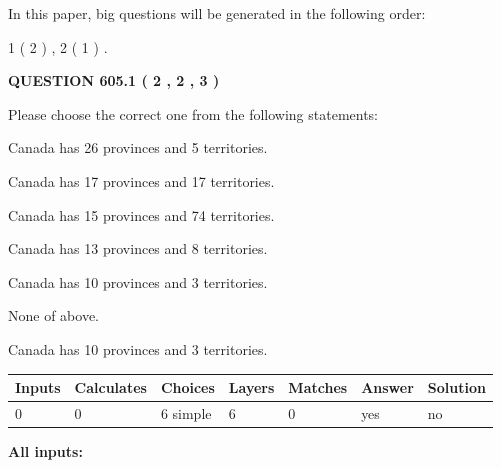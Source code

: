 \documentclass[12pt]{article}
\begin{document}
In this paper, big questions will be generated in the following order: 
   
   
   1 ( 2 )
 ,
   2 ( 1 )
 .
  
\vspace{0.2in}
  
{\textbf{\Large{QUESTION
605.1 
 ( 2 , 2 , 3 )
}}}
  
  
Please choose the correct one from the following statements:
 
 
Canada has  26 provinces and  5 territories.
 
 
Canada has  17 provinces and  17 territories.
 
 
Canada has  15 provinces and  74 territories.
 
 
Canada has  13 provinces and  8 territories.
 
 
Canada has 10  provinces and 3 territories.
 
 
 None of above.
 
 
\noindent{}
 
 
Canada has 10  provinces and 3 territories.
 
 
\noindent{}
 
 
   
   
   
   
\noindent\begin{tabular}{|l|l|l|l|l|l|l|}
 \hline
Inputs & Calculates & Choices & Layers & Matches & Answer & Solution \\ \hline
 0  & 
 0  & 
 6
  simple  
  & 
 6  & 
 0  & 
  yes & 
  no 
  \\ \hline
 \end{tabular}
   
   
   
   
\noindent{}
   
   
   
   
\noindent\vspace{0.1in}\hspace{-0.08in} {\textbf{\Large{All inputs: }}}
   
\end{document}
